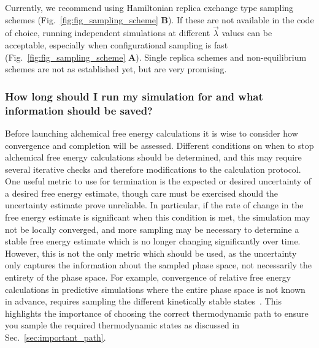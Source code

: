 \documentclass[9pt,bestpractices]{livecoms}
\begin{document}
Currently, we recommend using Hamiltonian replica exchange type sampling schemes (Fig.~\ref{fig:fig_sampling_scheme} \textbf{B}). If these are not available in the code of choice, running independent simulations at different $\vec{\lambda}$ values can be acceptable, especially when configurational sampling is fast (Fig.~\ref{fig:fig_sampling_scheme} \textbf{A}). Single replica schemes and non-equilibrium schemes are not as established yet, but are very promising.


\subsubsection{How long should I run my simulation for and what information should be saved?}
\label{sec:sim_length_information_kept}
Before launching alchemical free energy calculations it is wise to consider how convergence and completion will be assessed. Different conditions on when to stop alchemical free energy calculations should be determined, and this may require several iterative checks and therefore modifications to the calculation protocol.
One useful metric to use for termination is the expected or desired uncertainty of a desired free energy estimate, though care must be exercised should the uncertainty estimate prove unreliable.
In particular, if the rate of change in the free energy estimate is significant when this condition is met, the simulation may not be locally converged, and more sampling may be necessary to determine a stable free energy estimate which is no longer changing significantly over time. 
However, this is not the only metric which should be used, as the uncertainty only captures the information about the sampled phase space, not necessarily the entirety of the phase space.  
For example, convergence of relative free energy calculations in predictive simulations where the entire phase space is not known in advance, requires sampling the different kinetically stable states~\cite{mobley2012perspective}. 
This highlights the importance of choosing the correct thermodynamic path to ensure you sample the required thermodynamic states as discussed in Sec.~\ref{sec:important_path}.
\end{document}
